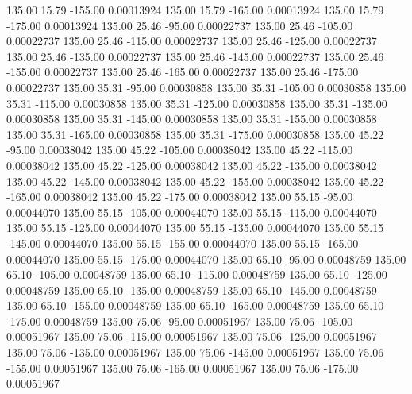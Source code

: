     135.00     15.79   -155.00     0.00013924
    135.00     15.79   -165.00     0.00013924
    135.00     15.79   -175.00     0.00013924
    135.00     25.46    -95.00     0.00022737
    135.00     25.46   -105.00     0.00022737
    135.00     25.46   -115.00     0.00022737
    135.00     25.46   -125.00     0.00022737
    135.00     25.46   -135.00     0.00022737
    135.00     25.46   -145.00     0.00022737
    135.00     25.46   -155.00     0.00022737
    135.00     25.46   -165.00     0.00022737
    135.00     25.46   -175.00     0.00022737
    135.00     35.31    -95.00     0.00030858
    135.00     35.31   -105.00     0.00030858
    135.00     35.31   -115.00     0.00030858
    135.00     35.31   -125.00     0.00030858
    135.00     35.31   -135.00     0.00030858
    135.00     35.31   -145.00     0.00030858
    135.00     35.31   -155.00     0.00030858
    135.00     35.31   -165.00     0.00030858
    135.00     35.31   -175.00     0.00030858
    135.00     45.22    -95.00     0.00038042
    135.00     45.22   -105.00     0.00038042
    135.00     45.22   -115.00     0.00038042
    135.00     45.22   -125.00     0.00038042
    135.00     45.22   -135.00     0.00038042
    135.00     45.22   -145.00     0.00038042
    135.00     45.22   -155.00     0.00038042
    135.00     45.22   -165.00     0.00038042
    135.00     45.22   -175.00     0.00038042
    135.00     55.15    -95.00     0.00044070
    135.00     55.15   -105.00     0.00044070
    135.00     55.15   -115.00     0.00044070
    135.00     55.15   -125.00     0.00044070
    135.00     55.15   -135.00     0.00044070
    135.00     55.15   -145.00     0.00044070
    135.00     55.15   -155.00     0.00044070
    135.00     55.15   -165.00     0.00044070
    135.00     55.15   -175.00     0.00044070
    135.00     65.10    -95.00     0.00048759
    135.00     65.10   -105.00     0.00048759
    135.00     65.10   -115.00     0.00048759
    135.00     65.10   -125.00     0.00048759
    135.00     65.10   -135.00     0.00048759
    135.00     65.10   -145.00     0.00048759
    135.00     65.10   -155.00     0.00048759
    135.00     65.10   -165.00     0.00048759
    135.00     65.10   -175.00     0.00048759
    135.00     75.06    -95.00     0.00051967
    135.00     75.06   -105.00     0.00051967
    135.00     75.06   -115.00     0.00051967
    135.00     75.06   -125.00     0.00051967
    135.00     75.06   -135.00     0.00051967
    135.00     75.06   -145.00     0.00051967
    135.00     75.06   -155.00     0.00051967
    135.00     75.06   -165.00     0.00051967
    135.00     75.06   -175.00     0.00051967
